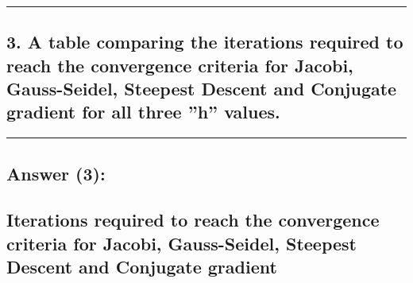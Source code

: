 \documentclass[11pt]{article}
\begin{document}
    \begin{center}
    \end{center}
    { \hspace*{\fill} \\}
    
    \begin{center}
    \end{center}
    { \hspace*{\fill} \\}
    
    \begin{center}
    \end{center}
    { \hspace*{\fill} \\}
    
    \begin{center}\rule{0.5\linewidth}{0.5pt}\end{center}

    \hypertarget{a-table-comparing-the-iterations-required-to-reach-the-convergence-criteria-for-jacobi-gauss-seidel-steepest-descent-and-conjugate-gradient-for-all-three-h-values.}{%
\subsection{3. A table comparing the iterations required to reach the
convergence criteria for Jacobi, Gauss-Seidel, Steepest Descent and
Conjugate gradient for all three ''h''
values.}\label{a-table-comparing-the-iterations-required-to-reach-the-convergence-criteria-for-jacobi-gauss-seidel-steepest-descent-and-conjugate-gradient-for-all-three-h-values.}}

    \begin{center}\rule{0.5\linewidth}{0.5pt}\end{center}

    \hypertarget{answer-3}{%
\subsection{Answer (3):}\label{answer-3}}

    \hypertarget{iterations-required-to-reach-the-convergence-criteria-for-jacobi-gauss-seidel-steepest-descent-and-conjugate-gradient}{%
\subsection{Iterations required to reach the convergence criteria for
Jacobi, Gauss-Seidel, Steepest Descent and Conjugate
gradient}\label{iterations-required-to-reach-the-convergence-criteria-for-jacobi-gauss-seidel-steepest-descent-and-conjugate-gradient}}
\end{document}
